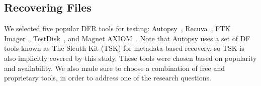 
\subsection{Recovering Files}

We selected five popular DFR tools for testing: Autopsy~\cite{autopsy}, Recuva~\cite{recuva}, FTK Imager~\cite{ftk}, TestDisk~\cite{testdisk}, and Magnet AXIOM~\cite{axiom}. 
Note that Autopsy uses a set of DF tools known as The Sleuth Kit (TSK) for metadata-based recovery, so TSK is also implicitly covered by this study. 
These tools were chosen based on popularity and availability.
We also made sure to choose a combination of free and proprietary tools, in order to address one of the research questions.

\begin{figure}[h]
    \centering


\end{figure}
